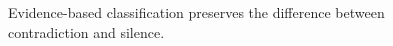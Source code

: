 \begin{figure}[H]
\centering
{}
\caption{Evidence-based classification preserves the difference between contradiction and silence.}\label{fig:gap-nli-evidence}
\end{figure}

